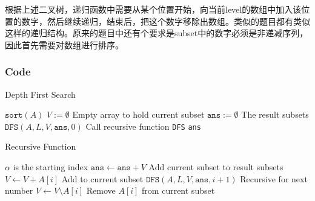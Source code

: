 \begin{CJK*}{UTF8}{gbsn}
根据上述二叉树，递归函数中需要从某个位置开始，向当前level的数组中加入该位置的数字，然后继续递归，结束后，把这个数字移除出数组。类似的题目都有类似这样的递归结构。原来的题目中还有个要求是subset中的数字必须是非递减序列，因此首先需要对数组进行排序。
\end{CJK*}
\subsubsection{Code}
\setcounter{algorithm}{0}
\begin{algorithm}[H]
\caption{Depth First Search}
\begin{algorithmic}[1]
\State $\texttt{sort}(A)$
\State $V:=\emptyset$ \Comment Empty array to hold current subset
\State $\texttt{ans}:=\emptyset$ \Comment The result subsets
\State $\texttt{DFS}(A, L, V, \texttt{ans}, 0)$ \Comment Call recursive function \texttt{DFS}
\State \Return \texttt{ans}
\EndProcedure
\end{algorithmic}
\end{algorithm}

\begin{algorithm}[H]
\caption{Recursive Function}
\begin{algorithmic}[1]
 \Comment $\alpha$ is the starting index
\State $\texttt{ans}\gets \texttt{ans} + V$ \Comment Add current subset to result subsets
\State $V\gets V + A[i]$ \Comment Add to current subset
\State $\texttt{DFS}(A, L, V, \texttt{ans}, i+1)$ \Comment Recursive for next number
\State $V\gets V\setminus A[i]$ \Comment Remove $A[i]$ from current subset
\EndFor
\EndFunction
\end{algorithmic}
\end{algorithm}